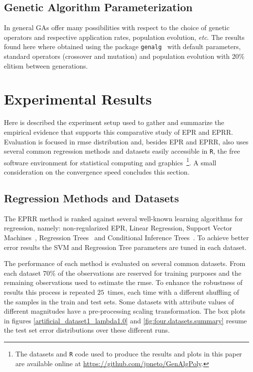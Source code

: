 \documentclass[preprint,authoryear,12pt]{elsarticle}
\begin{document}
\subsection{Genetic Algorithm Parameterization}

In general \acp{GA} offer many possibilities with respect to the choice of genetic operators and respective application rates, population evolution, \emph{etc}. The results found here where obtained using the package \texttt{genalg}~\citep{Willighagen:2012aa} with default parameters, standard operators (crossover and mutation) and population evolution with 20\% elitism between generations.

\section{Experimental Results}

Here is described the experiment setup used to gather and summarize the empirical evidence that supports this comparative study of \ac{EPR} and \ac{EPRR}. Evaluation is focused in \ac{rmse} distribution and, besides \ac{EPR} and \ac{EPRR}, also uses several common regression methods and datasets easily accessible in \texttt{R}, the free software environment for statistical computing and graphics~\citep{R-Core-Team:2013aa}\footnote{The datasets and \texttt{R} code used to produce the results and plots in this paper are available online at \url{https://github.com/jpneto/GenAlgPoly}.}. A small consideration on the convergence speed concludes this section.

\subsection{Regression Methods and Datasets}

The \ac{EPRR} method is ranked against several well-known learning algorithms for regression, namely: non-regularized \ac{EPR}, Linear Regression, Support Vector Machines~\citep{Meyer:2012aa}, Regression Trees~\citep{Therneau:2013aa} and Conditional Inference Trees~\citep{Hothorn:2006aa,Strobl:2007aa,Strobl:2008aa}. To achieve better error results the \ac{SVM} and Regression Tree parameters are tuned in each dataset.

The performance of each method is evaluated on several common datasets. From each dataset 70\% of the observations are reserved for training purposes and the remaining observations used to estimate the \ac{rmse}. To enhance the robustness of results this process is repeated $25$~times, each time with a different shuffling of the samples in the train and test sets. Some datasets with attribute values of different magnitudes have a pre-processing scaling transformation. The box plots in figures \ref{artificial_dataset1_lambda1.0} and \ref{fig:four.datasets.summary} resume the test set error distributions over these different runs.
\end{document}
